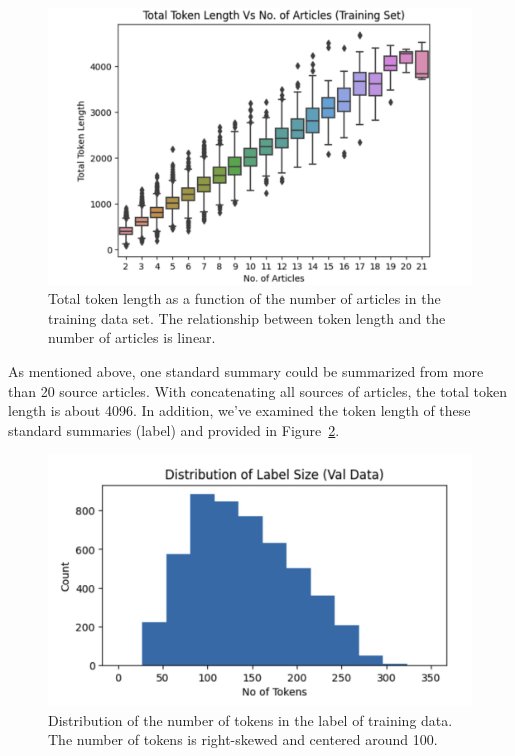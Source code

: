 \documentclass[12pt, twocolumn]{article}
\numberwithin{equation}{section}
\begin{document}
\begin{figure}
    \includegraphics[width=\textwidth]{token_length.png}
    \caption{Total token length as a function of the number of articles in the training data set. The relationship between token length and the number of articles is linear.}
    \label{fig:token-length}
\end{figure}

As mentioned above, one standard summary could be summarized from more than 20 source articles.  With concatenating all sources of articles, the total token length is about 4096. In addition, we've examined the token length of these standard summaries (label) and provided in Figure~\ref{fig:label-dist}.

\begin{figure}
    \includegraphics[width=\textwidth]{label_dist.png}
    \caption{Distribution of the number of tokens in the label of training data. The number of tokens is right-skewed and centered around 100.}
    \label{fig:label-dist}
\end{figure}
\end{document}
